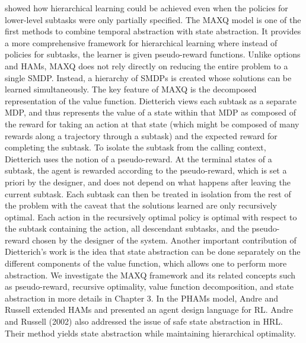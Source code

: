 showed how hierarchical learning could be achieved even when the policies for lower-level
subtasks were only partially specified. The MAXQ model is one of the first methods to
combine temporal abstraction with state abstraction. It provides a more comprehensive
framework for hierarchical learning where instead of policies for subtasks, the learner is
given pseudo-reward functions. Unlike options and HAMs, MAXQ does not rely directly
on reducing the entire problem to a single SMDP. Instead, a hierarchy of SMDPs is created
whose solutions can be learned simultaneously. The key feature of MAXQ is the decomposed
representation of the value function. Dietterich views each subtask as a separate
MDP, and thus represents the value of a state within that MDP as composed of the reward
for taking an action at that state (which might be composed of many rewards along a trajectory
through a subtask) and the expected reward for completing the subtask. To isolate
the subtask from the calling context, Dietterich uses the notion of a pseudo-reward. At the
terminal states of a subtask, the agent is rewarded according to the pseudo-reward, which
is set a priori by the designer, and does not depend on what happens after leaving the current
subtask. Each subtask can then be treated in isolation from the rest of the problem
with the caveat that the solutions learned are only recursively optimal. Each action in the
recursively optimal policy is optimal with respect to the subtask containing the action, all
descendant subtasks, and the pseudo-reward chosen by the designer of the system. Another
important contribution of Dietterich’s work is the idea that state abstraction can be done
separately on the different components of the value function, which allows one to perform
more abstraction. We investigate the MAXQ framework and its related concepts such as
pseudo-reward, recursive optimality, value function decomposition, and state abstraction in
more details in Chapter 3. In the PHAMs model, Andre and Russell extended HAMs and
presented an agent design language for RL. Andre and Russell (2002) also addressed the
issue of safe state abstraction in HRL. Their method yields state abstraction while maintaining
hierarchical optimality.


